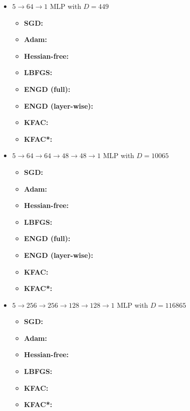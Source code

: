 \begin{itemize}
\item $5\to 64\to 1$ MLP with $D=449$
  \begin{itemize}
    \def\pathToRuns{../kfac_pinns_exp/exp27_heat4d_small/tex}
  \item \textbf{SGD:} 
  \item \textbf{Adam:} 
  \item \textbf{Hessian-free:} 
  \item \textbf{LBFGS:} 
  \item \textbf{ENGD (full):} 
  \item \textbf{ENGD (layer-wise):} 
  \item \textbf{KFAC:} 
  \item \textbf{KFAC*:} 
  \end{itemize}

\item $5 \to 64 \to 64 \to 48 \to 48 \to 1$ MLP with $D=\num{10065}$
  \begin{itemize}
    \def\pathToRuns{../kfac_pinns_exp/exp28_heat4d_medium/tex}
  \item \textbf{SGD:} 
  \item \textbf{Adam:} 
  \item \textbf{Hessian-free:} 
  \item \textbf{LBFGS:} 
  \item \textbf{ENGD (full):} 
  \item \textbf{ENGD (layer-wise):} 
  \item \textbf{KFAC:} 
  \item \textbf{KFAC*:} 
  \end{itemize}

\item $5 \to 256 \to 256\to 128 \to 128 \to 1$ MLP with $D=\num{116865}$
  \begin{itemize}
    \def\pathToRuns{../kfac_pinns_exp/exp29_heat4d_big/tex}
  \item \textbf{SGD:} 
  \item \textbf{Adam:} 
  \item \textbf{Hessian-free:} 
  \item \textbf{LBFGS:} 
  \item \textbf{KFAC:} 
  \item \textbf{KFAC*:} 
  \end{itemize}
\end{itemize}

